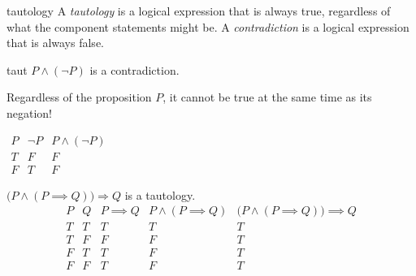 
\begin{defn}{}{tautology}
	A \emph{tautology} is a logical expression that is always true, regardless of what the component statements might be.\smallbreak
	A \emph{contradiction} is a logical expression that is always false.
\end{defn}


\begin{examples}{}{taut}
\exstart $P\wedge(\neg P)$ is a contradiction.
	
\begin{enumerate}\setcounter{enumi}{1}
  \begin{minipage}[t]{0.65\linewidth}\vspace{-8pt}
  	\item[] Regardless of the proposition $P$, it cannot be true at the same time as its negation!
  \end{minipage}
  \hfill
  \begin{minipage}[t]{0.29\linewidth}\vspace{-27pt}
	$\begin{array}{cc|c}
	P & \neg P & P\wedge(\neg P)\\\hline
	T & F & F\\
	F & T & F
	\end{array}$
  \end{minipage}\par
  
	\item\label{ex:taut2} $\bigl(P\wedge(P\implies Q)\bigr)\Longrightarrow Q$ is a tautology.
	\[\begin{array}{cc||c|c||c}
	P & Q & P\implies Q & P\wedge(P\implies Q) & \bigl(P\wedge(P\implies Q)\bigr)\implies Q\\\hline
	T & T & T & T& T\\
	T & F & F & F& T\\
	F & T & T & F& T\\
	F & F & T & F& T
	\end{array}\]
	\end{enumerate}
\end{examples}

